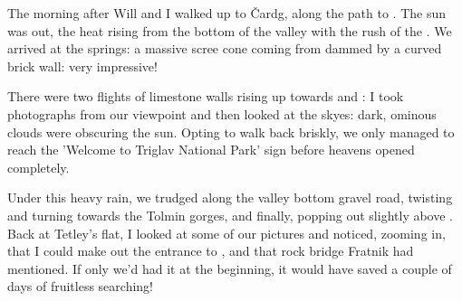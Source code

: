  The morning after Will and I walked up to \v{C}ardg, along the path to . The sun was out, the heat rising from the bottom of the valley with the rush of the . We arrived at the springs: a massive scree cone coming from  dammed by a curved brick wall: very impressive! 
 
There were two flights of limestone walls rising up towards  and : I took photographs from our viewpoint and then looked at the skyes: dark, ominous clouds were obscuring the sun. Opting to walk back briskly, we only managed to reach the 'Welcome to Triglav National Park' sign before heavens opened completely. 

Under this heavy rain, we trudged along the valley bottom gravel road, twisting and turning towards the Tolmin gorges, and finally, popping out slightly above . Back at Tetley's flat, I looked at some of our pictures and noticed, zooming in, that I could make out the entrance to , and that rock bridge Fratnik had mentioned. If only we'd had it at the beginning, it would have saved a couple of days of fruitless searching! 
 
